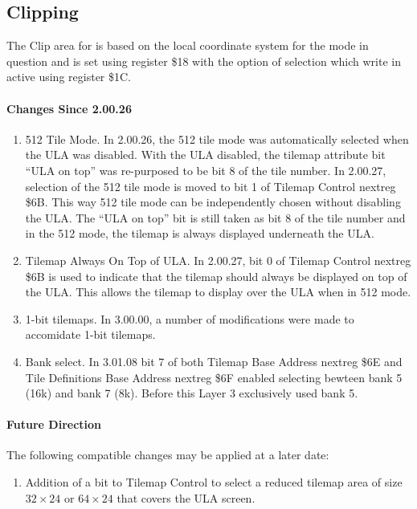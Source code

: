



\subsection{Clipping}
The Clip area for is based on the local coordinate system for the mode
in question and is set using register \$18 with the option of
selection which write in active using register \$1C.




\paragraph{Changes Since 2.00.26}

\begin{enumerate}
\item 512 Tile Mode. In 2.00.26, the 512 tile mode was automatically
  selected when the ULA was disabled. With the ULA disabled, the
  tilemap attribute bit “ULA on top” was re-purposed to be bit 8 of
  the tile number. In 2.00.27, selection of the 512 tile mode is moved
  to bit 1 of Tilemap Control nextreg \$6B. This way 512 tile mode can
  be independently chosen without disabling the ULA. The “ULA on top”
  bit is still taken as bit 8 of the tile number and in the 512 mode,
  the tilemap is always displayed underneath the ULA.
\item Tilemap Always On Top of ULA. In 2.00.27, bit 0 of Tilemap
  Control nextreg \$6B is used to indicate that the tilemap should
  always be displayed on top of the ULA. This allows the tilemap to
  display over the ULA when in 512 mode.
\item 1-bit tilemaps. In 3.00.00, a number of modifications were made
  to accomidate 1-bit tilemaps.
\item Bank select. In 3.01.08 bit 7 of both Tilemap Base
  Address nextreg \$6E and Tile Definitions Base Address nextreg \$6F
  enabled selecting bewteen bank 5 (16k) and bank 7 (8k). Before this
  Layer 3 exclusively used bank 5.
\end{enumerate}

\paragraph{Future Direction}

The following compatible changes may be applied at a later date:

\begin{enumerate}
\item Addition of a bit to Tilemap Control to select a reduced tilemap
  area of size $32\times24$ or $64\times24$ that covers the ULA
  screen.
\end{enumerate}
